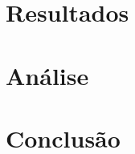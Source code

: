 \documentclass{report}
\begin{document}
\chapter{Resultados}
\label{chap:resultados}
\chapter{Análise}
\label{chap:analise}
\chapter{Conclusão}
\label{chap:conclusao}



\end{document}
